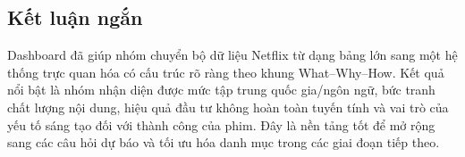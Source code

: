 \subsection{Kết luận ngắn}
Dashboard đã giúp nhóm chuyển bộ dữ liệu Netflix từ dạng bảng lớn sang một hệ thống trực quan hóa có cấu trúc rõ ràng theo khung What--Why--How. Kết quả nổi bật là nhóm nhận diện được mức tập trung quốc gia/ngôn ngữ, bức tranh chất lượng nội dung, hiệu quả đầu tư không hoàn toàn tuyến tính và vai trò của yếu tố sáng tạo đối với thành công của phim. Đây là nền tảng tốt để mở rộng sang các câu hỏi dự báo và tối ưu hóa danh mục trong các giai đoạn tiếp theo.
